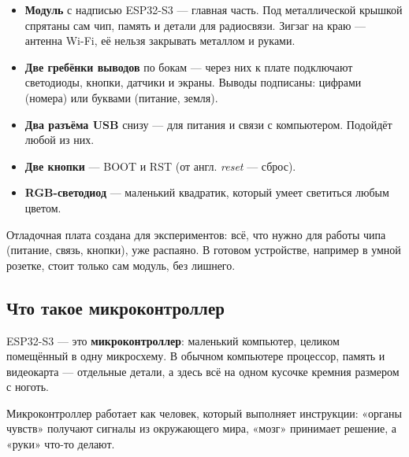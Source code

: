\begin{itemize}
  \item \textbf{Модуль} с надписью ESP32-S3 --- главная часть. Под металлической крышкой спрятаны
        сам чип, память и детали для радиосвязи. Зигзаг на краю --- антенна Wi-Fi, её нельзя закрывать
        металлом и руками.
  \item \textbf{Две гребёнки выводов} по бокам --- через них к плате подключают светодиоды, кнопки,
        датчики и экраны. Выводы подписаны: цифрами (номера) или буквами (питание, земля).
  \item \textbf{Два разъёма USB} снизу --- для питания и связи с компьютером. Подойдёт любой из них.
  \item \textbf{Две кнопки} --- BOOT и RST (от англ. \emph{reset} --- сброс).
  \item \textbf{RGB-светодиод} --- маленький квадратик, который умеет светиться любым цветом.
\end{itemize}

\begin{tip}
Отладочная плата создана для экспериментов: всё, что нужно для работы чипа (питание, связь, кнопки),
уже распаяно. В готовом устройстве, например в умной розетке, стоит только сам модуль, без лишнего.
\end{tip}

\subsection{Что такое микроконтроллер}

ESP32-S3 --- это \textbf{микроконтроллер}: маленький компьютер, целиком помещённый в одну микросхему.
В обычном компьютере процессор, память и видеокарта --- отдельные детали, а здесь всё на одном
кусочке кремния размером с ноготь.

Микроконтроллер работает как человек, который выполняет инструкции: «органы чувств» получают
сигналы из окружающего мира, «мозг» принимает решение, а «руки» что-то делают.

